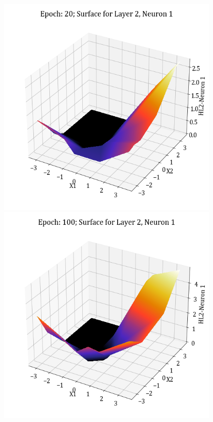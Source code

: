 \documentclass[11pt,a4paper]{article}
\begin{document}
\begin{figure}[H]
    \includegraphics[scale=0.4]{images/1B_MLFFNN_E20_HL2_N1.png}
    \includegraphics[scale=0.4]{images/1B_MLFFNN_E100_HL2_N1.png}

\end{figure}
\end{document}
